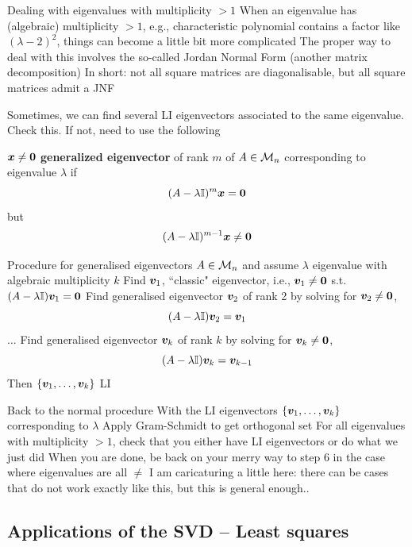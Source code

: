 \documentclass[aspectratio=169]{beamer}\usepackage[]{graphicx}\usepackage[]{xcolor}
\begin{document}
\begin{frame}{Dealing with eigenvalues with multiplicity $>1$}
When an eigenvalue has (algebraic) multiplicity $>1$, e.g., characteristic polynomial contains a factor like $(\lambda-2)^2$, things can become a little bit more complicated
\vfill
The proper way to deal with this involves the so-called Jordan Normal Form (another matrix decomposition)
\vfill
In short: not all square matrices are diagonalisable, but all square matrices admit a JNF
\end{frame}


\begin{frame}
Sometimes, we can find several LI eigenvectors associated to the same eigenvalue. Check this. If not, need to use the following
\vfill
\begin{definition}
$\bx\neq\b0$ \textbf{generalized eigenvector} of rank $m$ of $A\in\mathcal{M}_n$ corresponding to eigenvalue $\lambda$ if
\[
(A-\lambda\II)^{m}\bx = \b0
\]
but
\[
(A-\lambda\II)^{m-1}\bx\neq \b0
\]
\end{definition}
\end{frame}


\begin{frame}{Procedure for generalised eigenvectors}
$A\in\mathcal{M}_n$ and assume $\lambda$ eigenvalue with algebraic multiplicity $k$
\vfill
Find $\bm{v}_1$, ``classic" eigenvector, i.e., $\bv_1\neq\b0$ s.t. $(A-\lambda\II)\bv_1=\b0$
\vfill
Find generalised eigenvector $\bm{v}_2$ of rank 2 by solving for $\bv_2\neq\b0$,
\[
(A-\lambda\mathbb{I})\bm{v}_2 = \bm{v}_1
\]
$\ldots$
\vfill
Find generalised eigenvector $\bm{v}_k$ of rank $k$ by solving for $\bv_k\neq\b0$,
\[
(A-\lambda\mathbb{I})\bm{v}_k = \bm{v}_{k-1}
\]
\vfill
Then $\{\bm{v}_1,\ldots,\bm{v}_k\}$ LI
\end{frame}


\begin{frame}{Back to the normal procedure}
With the LI eigenvectors $\{\bm{v}_1,\ldots,\bm{v}_k\}$ corresponding to $\lambda$
\vfill
Apply Gram-Schmidt to get orthogonal set
\vfill
For all eigenvalues with multiplicity $>1$, check that you either have LI eigenvectors or do what we just did
\vfill
When you are done, be back on your merry way to step 6 in the case where eigenvalues are all $\neq$
\vfill
I am caricaturing a little here: there can be cases that do not work exactly like this, but this is general enough..
\end{frame}

\subsection{Applications of the SVD -- Least squares}
\end{document}
